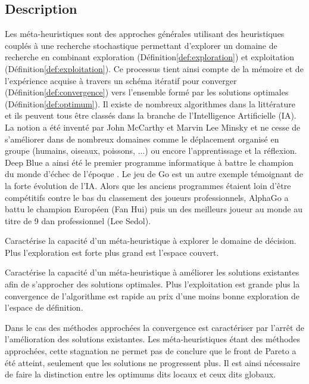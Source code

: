 \subsection{Description} %
\label{sub:description}
Les méta-heuristiques sont des approches générales utilisant des heuristiques
couplés à une recherche stochastique permettant d’explorer un domaine de recherche
en combinant exploration (Définition\ref{def:exploration}) et exploitation (Définition\ref{def:exploitation}).
Ce processus tient ainsi compte de la mémoire et de l’expérience acquise à travers
un schéma itératif pour converger (Définition\ref{def:convergence})
vers l’ensemble formé par les solutions optimales (Définition\ref{def:optimum}).
Il existe de nombreux algorithmes dans la littérature et ils peuvent tous être classés
dans la branche de l’Intelligence Artificielle (IA).
La notion a été inventé par John McCarthy et Marvin Lee Minsky et ne cesse de s’améliorer
dans de nombreux domaines comme le déplacement organisé en groupe (humains, oiseaux, poissons, ...)
ou encore l’apprentissage et la réflexion. Deep Blue a ainsi été le premier programme
informatique à battre le champion du monde d’échec de l’époque \parencite{Hsu199970}.
Le jeu de Go est un autre exemple témoignant de la forte évolution de l’IA. Alors que
les anciens programmes étaient loin d’être compétitifs contre le bas du classement
des joueurs professionnels, AlphaGo \parencite{Silver2016484} a battu le champion Européen (Fan Hui)
puis un des meilleurs joueur au monde au titre de 9 dan professionnel (Lee Sedol).

\begin{Def}[Exploration]\label{def:exploration}
Caractérise la capacité d’un méta-heuristique à explorer le domaine de décision.
Plus l’exploration est forte plus grand est l’espace couvert.
\end{Def}

\begin{Def}[Exploitation]\label{def:exploitation}
Caractérise la capacité d’un méta-heuristique à améliorer les solutions existantes
afin de s’approcher des solutions optimales. Plus l’exploitation est grande plus
la convergence de l’algorithme est rapide au prix d’une moins bonne exploration
de l’espace de définition.
\end{Def}

\begin{Def}[Convergence]\label{def:convergence}
Dans le cas des méthodes approchées la convergence est caractériser par l’arrêt
de l’amélioration des solutions existantes. Les méta-heuristiques étant des méthodes
approchées, cette stagnation ne permet pas de conclure que le front de Pareto a été
atteint, seulement que les solutions ne progressent plus. Il est ainsi nécessaire
de faire la distinction entre les optimums dits locaux et ceux dits globaux.
\end{Def}

